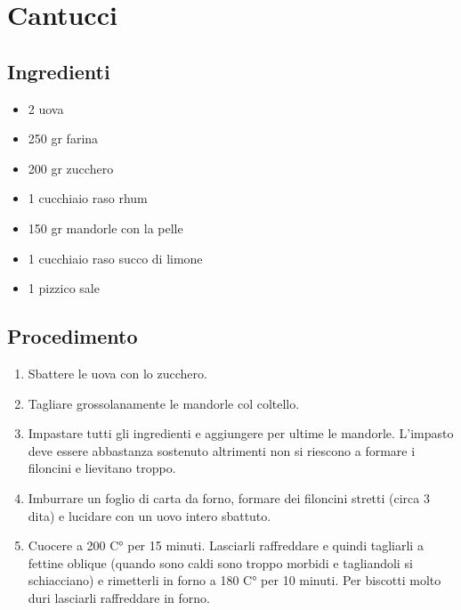 \section{Cantucci}
\subsection{Ingredienti}
\begin{itemize}
\item 2 uova  
\item 250 gr farina  
\item 200 gr zucchero  
\item 1 cucchiaio raso rhum  
\item 150 gr mandorle con la pelle  
\item 1 cucchiaio raso succo di limone  
\item 1 pizzico sale
\end{itemize}
\subsection{Procedimento}
\begin{enumerate}
\item  Sbattere le uova con lo zucchero.  
\item  Tagliare grossolanamente le mandorle col coltello.  
\item  Impastare tutti gli ingredienti e aggiungere per ultime le mandorle. L'impasto deve essere abbastanza sostenuto altrimenti non si riescono a formare i filoncini e lievitano troppo.  
\item  Imburrare un foglio di carta da forno, formare dei filoncini stretti (circa 3 dita) e lucidare con un uovo intero sbattuto.   
\item  Cuocere a 200 C° per 15 minuti. Lasciarli raffreddare e quindi tagliarli a fettine oblique (quando sono caldi sono troppo morbidi e tagliandoli si schiacciano) e rimetterli in forno a 180 C° per 10 minuti. Per biscotti molto duri lasciarli raffreddare in forno.
\end{enumerate}

